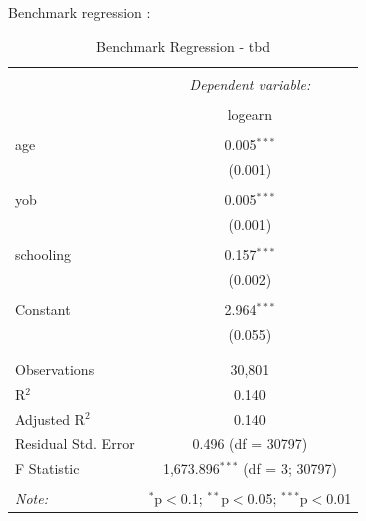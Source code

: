 \documentclass[a4paper,12pt,oneside,English]{article}
\begin{document}
Benchmark regression :
\begin{table}[!htbp] \centering 
  \caption{Benchmark Regression - tbd} 
  \label{reg 1} 
\begin{tabular}{@{\extracolsep{5pt}}lc} 
\\[-1.8ex]\hline 
\hline \\[-1.8ex] 
 & \multicolumn{1}{c}{\textit{Dependent variable:}} \\ 
\cline{2-2} 
\\[-1.8ex] & logearn \\ 
\hline \\[-1.8ex] 
 age & 0.005$^{***}$ \\ 
  & (0.001) \\ 
  & \\ 
 yob & 0.005$^{***}$ \\ 
  & (0.001) \\ 
  & \\ 
 schooling & 0.157$^{***}$ \\ 
  & (0.002) \\ 
  & \\ 
 Constant & 2.964$^{***}$ \\ 
  & (0.055) \\ 
  & \\ 
\hline \\[-1.8ex] 
Observations & 30,801 \\ 
R$^{2}$ & 0.140 \\ 
Adjusted R$^{2}$ & 0.140 \\ 
Residual Std. Error & 0.496 (df = 30797) \\ 
F Statistic & 1,673.896$^{***}$ (df = 3; 30797) \\ 
\hline 
\hline \\[-1.8ex] 
\textit{Note:}  & \multicolumn{1}{r}{$^{*}$p$<$0.1; $^{**}$p$<$0.05; $^{***}$p$<$0.01} \\ 
\end{tabular} 
\end{table}
\end{document}
